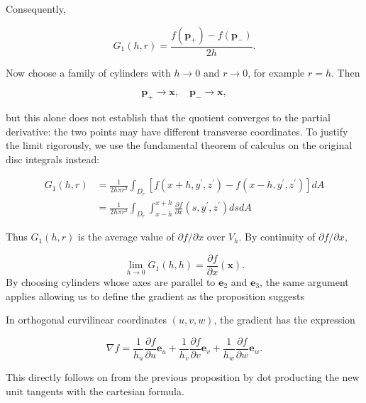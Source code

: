 \begin{formalproof}
Consequently,

\[
G_1(h, r)=\frac{f\left(\boldsymbol{p}_{+}\right)-f\left(\boldsymbol{p}_{-}\right)}{2 h} .
\]

Now choose a family of cylinders with \(h \rightarrow 0\) and \(r \rightarrow 0\), for example \(r=h\). Then

\[
\boldsymbol{p}_{+} \rightarrow \boldsymbol{x}, \quad \boldsymbol{p}_{-} \rightarrow \boldsymbol{x},
\]

but this alone does not establish that the quotient converges to the partial derivative: the two points may have different transverse coordinates. To justify the limit rigorously, we use the fundamental theorem of calculus on the original disc integrals instead:

\[
\begin{aligned}
G_1(h, r) & =\frac{1}{2 h \pi r^2} \int_{D_r}\left[f\left(x+h, y^{\prime}, z^{\prime}\right)-f\left(x-h, y^{\prime}, z^{\prime}\right)\right] d A \\
& =\frac{1}{2 h \pi r^2} \int_{D_r} \int_{x-h}^{x+h} \frac{\partial f}{\partial x}\left(s, y^{\prime}, z^{\prime}\right) d s d A
\end{aligned}
\]

Thus \(G_1(h, r)\) is the average value of \(\partial f / \partial x\) over \(V_h\). By continuity of \(\partial f / \partial x\),

\[
\lim _{h \rightarrow 0} G_1(h, h)=\frac{\partial f}{\partial x}(\boldsymbol{x}) .
\]
By choosing cylinders whose axes are parallel to \(\boldsymbol{e}_2\) and \(\boldsymbol{e}_3\), the same argument applies allowing us to define the gradient as the proposition suggests

\end{formalproof}
  

\begin{proposition}
  In orthogonal curvilinear coordinates \((u, v, w)\), the gradient has the expression

\[
\nabla f=\frac{1}{h_u} \frac{\partial f}{\partial u} \boldsymbol{e}_u+\frac{1}{h_v} \frac{\partial f}{\partial v} \boldsymbol{e}_v+\frac{1}{h_w} \frac{\partial f}{\partial w} \boldsymbol{e}_w .
\]
\end{proposition}

\begin{proofidea}

  This directly follows on from the previous proposition by dot producting the new unit tangents with the cartesian formula.
  
\end{proofidea}
  
